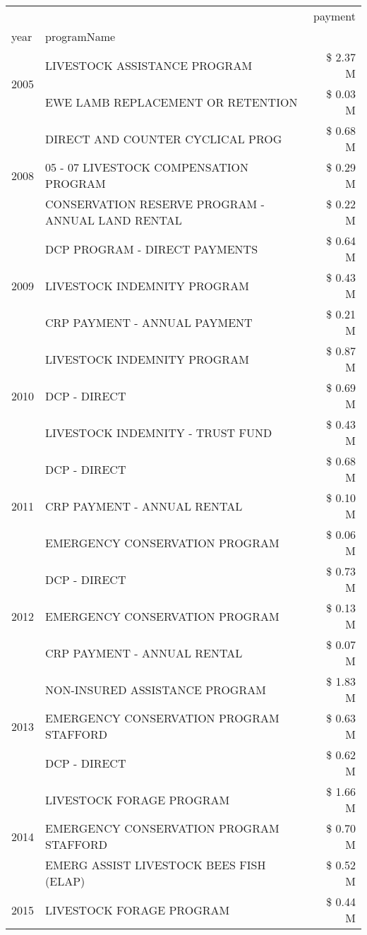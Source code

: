 \begin{tabular}{llr}
\toprule
 &  & payment \\
year & programName &  \\
\midrule
\multirow[t]{2}{*}{2005} & LIVESTOCK ASSISTANCE PROGRAM & \$ 2.37 M \\
 & EWE LAMB REPLACEMENT OR RETENTION & \$ 0.03 M \\
\cline{1-3}
\multirow[t]{3}{*}{2008} & DIRECT AND COUNTER CYCLICAL PROG & \$ 0.68 M \\
 & 05 - 07 LIVESTOCK COMPENSATION PROGRAM & \$ 0.29 M \\
 & CONSERVATION RESERVE PROGRAM - ANNUAL LAND RENTAL & \$ 0.22 M \\
\cline{1-3}
\multirow[t]{3}{*}{2009} & DCP PROGRAM - DIRECT PAYMENTS & \$ 0.64 M \\
 & LIVESTOCK INDEMNITY PROGRAM & \$ 0.43 M \\
 & CRP PAYMENT - ANNUAL PAYMENT & \$ 0.21 M \\
\cline{1-3}
\multirow[t]{3}{*}{2010} & LIVESTOCK INDEMNITY PROGRAM & \$ 0.87 M \\
 & DCP - DIRECT & \$ 0.69 M \\
 & LIVESTOCK INDEMNITY - TRUST FUND & \$ 0.43 M \\
\cline{1-3}
\multirow[t]{3}{*}{2011} & DCP - DIRECT & \$ 0.68 M \\
 & CRP PAYMENT - ANNUAL RENTAL & \$ 0.10 M \\
 & EMERGENCY CONSERVATION PROGRAM & \$ 0.06 M \\
\cline{1-3}
\multirow[t]{3}{*}{2012} & DCP - DIRECT & \$ 0.73 M \\
 & EMERGENCY CONSERVATION PROGRAM & \$ 0.13 M \\
 & CRP PAYMENT - ANNUAL RENTAL & \$ 0.07 M \\
\cline{1-3}
\multirow[t]{3}{*}{2013} & NON-INSURED ASSISTANCE PROGRAM & \$ 1.83 M \\
 & EMERGENCY CONSERVATION PROGRAM STAFFORD & \$ 0.63 M \\
 & DCP - DIRECT & \$ 0.62 M \\
\cline{1-3}
\multirow[t]{3}{*}{2014} & LIVESTOCK FORAGE PROGRAM & \$ 1.66 M \\
 & EMERGENCY CONSERVATION PROGRAM STAFFORD & \$ 0.70 M \\
 & EMERG ASSIST LIVESTOCK BEES FISH (ELAP) & \$ 0.52 M \\
\cline{1-3}
\multirow[t]{3}{*}{2015} & LIVESTOCK FORAGE PROGRAM & \$ 0.44 M \\

\end{tabular}
